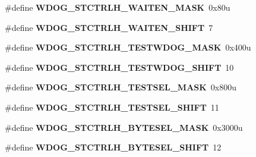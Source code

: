 \begin{DoxyCompactItemize}
\item 
\#define {\bfseries W\+D\+O\+G\+\_\+\+S\+T\+C\+T\+R\+L\+H\+\_\+\+W\+A\+I\+T\+E\+N\+\_\+\+M\+A\+SK}~0x80u\hypertarget{group__WDOG__Register__Masks_gad6e2dd88be51a78f133085bb0df3a5f9}{}\label{group__WDOG__Register__Masks_gad6e2dd88be51a78f133085bb0df3a5f9}

\item 
\#define {\bfseries W\+D\+O\+G\+\_\+\+S\+T\+C\+T\+R\+L\+H\+\_\+\+W\+A\+I\+T\+E\+N\+\_\+\+S\+H\+I\+FT}~7\hypertarget{group__WDOG__Register__Masks_gad224b313777fd019f8ec46f1791a52b7}{}\label{group__WDOG__Register__Masks_gad224b313777fd019f8ec46f1791a52b7}

\item 
\#define {\bfseries W\+D\+O\+G\+\_\+\+S\+T\+C\+T\+R\+L\+H\+\_\+\+T\+E\+S\+T\+W\+D\+O\+G\+\_\+\+M\+A\+SK}~0x400u\hypertarget{group__WDOG__Register__Masks_ga155c6ba1a6269c937ad8a1e1500686aa}{}\label{group__WDOG__Register__Masks_ga155c6ba1a6269c937ad8a1e1500686aa}

\item 
\#define {\bfseries W\+D\+O\+G\+\_\+\+S\+T\+C\+T\+R\+L\+H\+\_\+\+T\+E\+S\+T\+W\+D\+O\+G\+\_\+\+S\+H\+I\+FT}~10\hypertarget{group__WDOG__Register__Masks_ga3b923179c1bd41abe9fbab0ee57740c0}{}\label{group__WDOG__Register__Masks_ga3b923179c1bd41abe9fbab0ee57740c0}

\item 
\#define {\bfseries W\+D\+O\+G\+\_\+\+S\+T\+C\+T\+R\+L\+H\+\_\+\+T\+E\+S\+T\+S\+E\+L\+\_\+\+M\+A\+SK}~0x800u\hypertarget{group__WDOG__Register__Masks_gad8ac03c1a9c77ee59f938c243db30a42}{}\label{group__WDOG__Register__Masks_gad8ac03c1a9c77ee59f938c243db30a42}

\item 
\#define {\bfseries W\+D\+O\+G\+\_\+\+S\+T\+C\+T\+R\+L\+H\+\_\+\+T\+E\+S\+T\+S\+E\+L\+\_\+\+S\+H\+I\+FT}~11\hypertarget{group__WDOG__Register__Masks_gaf41cdd95d386a6b663fa3adea03699e1}{}\label{group__WDOG__Register__Masks_gaf41cdd95d386a6b663fa3adea03699e1}

\item 
\#define {\bfseries W\+D\+O\+G\+\_\+\+S\+T\+C\+T\+R\+L\+H\+\_\+\+B\+Y\+T\+E\+S\+E\+L\+\_\+\+M\+A\+SK}~0x3000u\hypertarget{group__WDOG__Register__Masks_ga20d3012eda5935f73ec4a9e24720fdc2}{}\label{group__WDOG__Register__Masks_ga20d3012eda5935f73ec4a9e24720fdc2}

\item 
\#define {\bfseries W\+D\+O\+G\+\_\+\+S\+T\+C\+T\+R\+L\+H\+\_\+\+B\+Y\+T\+E\+S\+E\+L\+\_\+\+S\+H\+I\+FT}~12\hypertarget{group__WDOG__Register__Masks_ga0f73c2f0d56eac9caafc8a0337f95cc8}{}\label{group__WDOG__Register__Masks_ga0f73c2f0d56eac9caafc8a0337f95cc8}


\end{DoxyCompactItemize}
